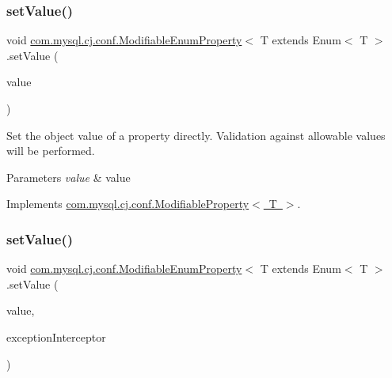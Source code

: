 \mbox{\label{classcom_1_1mysql_1_1cj_1_1conf_1_1_modifiable_enum_property_a75933d467e8ce6bf8da46c21e3177e0f}} 
\subsubsection{\texorpdfstring{set\+Value()}{setValue()}\hspace{0.1cm}{\footnotesize\ttfamily [1/2]}}
{\footnotesize\ttfamily void \mbox{\hyperlink{classcom_1_1mysql_1_1cj_1_1conf_1_1_modifiable_enum_property}{com.\+mysql.\+cj.\+conf.\+Modifiable\+Enum\+Property}}$<$ T extends Enum$<$ T $>$.set\+Value (\begin{DoxyParamCaption}\item[{T}]{value }\end{DoxyParamCaption})}

Set the object value of a property directly. Validation against allowable values will be performed.


\begin{DoxyParams}{Parameters}
{\em value} & value \\
\hline
\end{DoxyParams}


Implements \mbox{\hyperlink{interfacecom_1_1mysql_1_1cj_1_1conf_1_1_modifiable_property_a22d1b9332f523a15f3edf432b36e4e07}{com.\+mysql.\+cj.\+conf.\+Modifiable\+Property$<$ T $>$}}.

\mbox{\label{classcom_1_1mysql_1_1cj_1_1conf_1_1_modifiable_enum_property_aeb04443d10144806024e2a28bf4942de}} 
\subsubsection{\texorpdfstring{set\+Value()}{setValue()}\hspace{0.1cm}{\footnotesize\ttfamily [2/2]}}
{\footnotesize\ttfamily void \mbox{\hyperlink{classcom_1_1mysql_1_1cj_1_1conf_1_1_modifiable_enum_property}{com.\+mysql.\+cj.\+conf.\+Modifiable\+Enum\+Property}}$<$ T extends Enum$<$ T $>$.set\+Value (\begin{DoxyParamCaption}\item[{T}]{value,  }\item[{\mbox{\hyperlink{interfacecom_1_1mysql_1_1cj_1_1exceptions_1_1_exception_interceptor}{Exception\+Interceptor}}}]{exception\+Interceptor }\end{DoxyParamCaption})}

